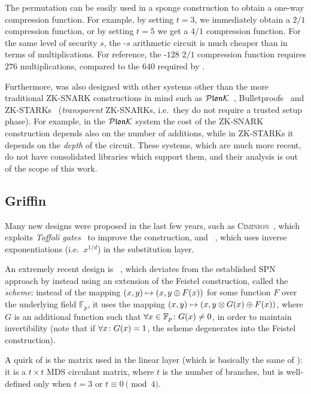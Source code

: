 The \Poseidon{} permutation can be easily used in a sponge construction to obtain a
one-way compression function.
For example, by setting \(t = 3\), we immediately obtain a \(2/1\) compression function, 
or by setting \(t = 5\) we get a \(4/1\) compression function.
For the same level of security \(s\), the \Poseidon-\(s\) arithmetic circuit is much cheaper than 
\Mimc{} in terms of multiplications. 
For reference, the \Poseidon-\(128\) \(2/1\) compression function requires \(276\) 
multiplications, compared to the \(640\) required by \Mimc{}.

Furthermore, \Poseidon{} was also designed with other systems other than the more traditional 
ZK-SNARK constructions in mind such as \(\mathcal{P}\mathfrak{lon}\mathcal{K} \)~\cite{GabizonWC2019}, 
Bulletproofs~\cite{BunzBBPWM2017} and ZK-STARKs~\cite{SassonBHR2018} 
(\emph{transparent} ZK-SNARKs, i.e.\ they do not require a trusted setup phase).
For example, in the \(\mathcal{P}\mathfrak{lon}\mathcal{K} \) system the cost of the ZK-SNARK construction depends also 
on the number of additions, while in ZK-STARKs it depends on the \emph{depth} of the circuit.
These systems, which are much more recent, do not have consolidated libraries which support them, 
and their analysis is out of the scope of this work.

\subsection{Griffin}
Many new designs were proposed in the last few years, such as 
\textsc{Ciminion}~\cite{DobraunigGGK2021}, which exploits \emph{Toffoli gates}~\cite{Toffoli1980} 
to improve the construction, and \Rescue~\cite{AlyABDS2019}, which uses inverse 
exponentiations (i.e.\  \(x^{1/d}\)) in the substitution layer.

An extremely recent design is \Griffin~\cite{GrassiHRSWW2022}, which deviates from the
established SPN approach by instead using an extension of the Feistel construction, called the 
\emph{\Horst{} scheme}: instead of the mapping 
\(\Tuple{x, y} \mapsto \Tuple{x, y \oplus \call{F}{x}}\) for some function \(F\) over the 
underlying field \(\mathbb{F}_p\), it uses the mapping 
\(\Tuple{x, y} \mapsto \Tuple{x, y \otimes \call{G}{x} \oplus \call{F}{x}}\), where \(G\) is an 
additional function such that \(\forall x \in \mathbb{F}_p\colon \call{G}{x} \neq 0\), in order 
to maintain invertibility (note that if \(\forall x\colon \call{G}{x} = 1\), the \Horst{} scheme
degenerates into the Feistel construction).

A quirk of \Griffin{} is the matrix used in the linear layer (which is basically the same of 
\Poseidon): it is a \(t \times t\) MDS circulant matrix, where \(t\) is the number of branches, 
but is well-defined only when \(t = 3\) or \(t \equiv 0 \pmod{4}\).

